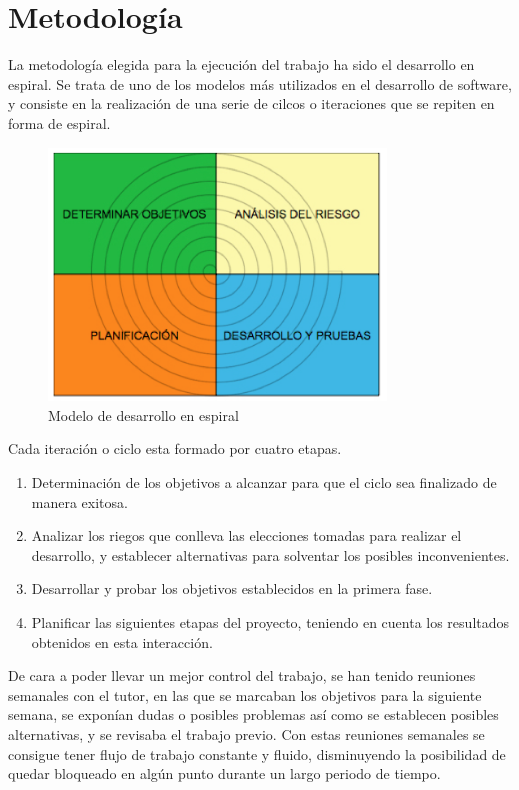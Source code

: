 \section{Metodología}
La metodología elegida para la ejecución del trabajo ha sido el desarrollo en espiral. Se trata de uno de los modelos más utilizados en el desarrollo de software, y consiste en la realización de una serie de cilcos o iteraciones que se repiten en forma de espiral.
\begin{figure}[H]
  \begin{center}
    \includegraphics[width=0.8\textwidth]{figures/desarrolloespiral.png}
		\caption{Modelo de desarrollo en espiral}
		\label{fig.desarrolloespiral}
		\end{center}
\end{figure}
Cada iteración o ciclo esta formado por cuatro etapas.
\begin{enumerate}
\item Determinación de los objetivos a alcanzar para que el ciclo sea finalizado de manera exitosa.
\item Analizar los riegos que conlleva las elecciones tomadas para realizar el desarrollo, y establecer alternativas para solventar los posibles inconvenientes.
\item Desarrollar y probar los objetivos establecidos en la primera fase.
\item Planificar las siguientes etapas del proyecto, teniendo en cuenta los resultados obtenidos en esta interacción.
\end{enumerate}
De cara a poder llevar un mejor control del trabajo, se han tenido reuniones semanales con el tutor, en las que se marcaban los objetivos para la siguiente semana, se exponían dudas o posibles problemas  así como se establecen posibles alternativas, y se revisaba el trabajo previo. Con estas reuniones semanales se consigue tener flujo de trabajo constante y fluido, disminuyendo la posibilidad de quedar bloqueado en algún punto durante un largo periodo de tiempo.

